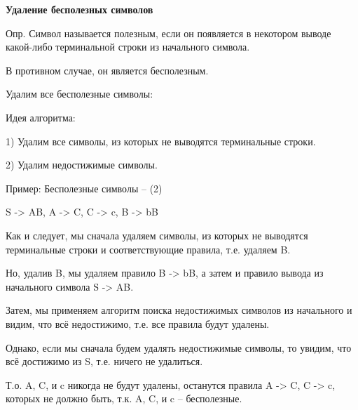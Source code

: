 \documentclass{article}
\begin{document}
\textbf{Удаление бесполезных символов}

 Опр. Символ называется полезным, если он появляется в
некотором выводе какой-либо терминальной строки из
начального символа.

 В противном случае, он является бесполезным.

 Удалим все бесполезные символы:

 Идея алгоритма:

1) Удалим все символы, из которых не выводятся терминальные
строки.

2) Удалим недостижимые символы.


Пример: Бесполезные символы – (2)

S -> AB, A -> C, C -> c, B -> bB

 Как и следует, мы сначала удаляем символы, из которых не
выводятся терминальные строки и соответствующие правила, т.е.
удаляем B.

 Но, удалив B, мы удаляем правило B -> bB, а затем и правило
вывода из начального символа S -> AB.

 Затем, мы применяем алгоритм поиска недостижимых символов
из начального и видим, что всё недостижимо, т.е. все правила
будут удалены.

 Однако, если мы сначала будем удалять недостижимые символы,
то увидим, что всё достижимо из S, т.е. ничего не удалиться.

 Т.о. A, C, и c никогда не будут удалены, останутся правила A -> C,
C -> c, которых не должно быть, т.к. A, C, и c – бесполезные.
\end{document}
